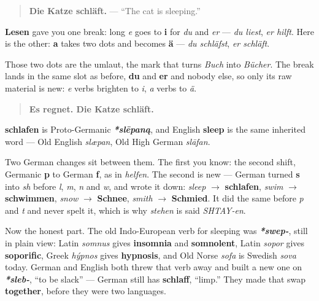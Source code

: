 \begin{quote}
\textbf{Die Katze schläft.} — \textquotedblleft{}The cat is sleeping.\textquotedblright{}
\end{quote}

\begin{grammarlens}[title={Grammar Lens: the second kind of break}]
\textbf{Lesen} gave you one break: long \emph{e} goes to \textbf{i} for \emph{du} and \emph{er} — \emph{du liest}, \emph{er hilft}. Here is the other: \textbf{a} takes two dots and becomes \textbf{ä} — \emph{du schläfst}, \emph{er schläft}.

Those two dots are the umlaut, the mark that turns \emph{Buch} into \emph{Bücher}. The break lands in the same slot as before, \textbf{du} and \textbf{er} and nobody else, so only its raw material is new: \emph{e} verbs brighten to \emph{i}, \emph{a} verbs to \emph{ä}.

\begin{quote}
\textbf{Es regnet. Die Katze schläft.}
\end{quote}
\end{grammarlens}

\begin{cousinweb}
\textbf{schlafen} is Proto-Germanic \emph{\textbf{*slēpaną}}, and English \textbf{sleep} is the same inherited word — Old English \emph{slæpan}, Old High German \emph{slāfan}.

Two German changes sit between them. The first you know: the second shift, Germanic \textbf{p} to German \textbf{f}, as in \emph{helfen}. The second is new — German turned \textbf{s} into \emph{sh} before \emph{l}, \emph{m}, \emph{n} and \emph{w}, and wrote it down: \emph{sleep} $\to$ \textbf{schlafen}, \emph{swim} $\to$ \textbf{schwimmen}, \emph{snow} $\to$ \textbf{Schnee}, \emph{smith} $\to$ \textbf{Schmied}. It did the same before \emph{p} and \emph{t} and never spelt it, which is why \emph{stehen} is said \emph{SHTAY-en}.

Now the honest part. The old Indo-European verb for sleeping was \emph{\textbf{*swep-}}, still in plain view: Latin \emph{somnus} gives \textbf{insomnia} and \textbf{somnolent}, Latin \emph{sopor} gives \textbf{soporific}, Greek \emph{hýpnos} gives \textbf{hypnosis}, and Old Norse \emph{sofa} is Swedish \emph{sova} today. German and English both threw that verb away and built a new one on \emph{\textbf{*sleb-}}, \textquotedblleft{}to be slack\textquotedblright{} — German still has \textbf{schlaff}, \textquotedblleft{}limp.\textquotedblright{} They made that swap \textbf{together}, before they were two languages.
\end{cousinweb}

